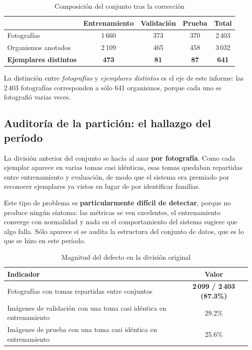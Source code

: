 \documentclass[onecolumn]{article}
\begin{document}
\begin{table}[H]
\centering
\renewcommand{\arraystretch}{1.15}
\caption{Composición del conjunto tras la corrección}
\label{tab:composicion}
\begin{tabular}{lcccc}
\hline
 & \textbf{Entrenamiento} & \textbf{Validación} & \textbf{Prueba} & \textbf{Total} \\
\hline
Fotografías          & 1\,660 & 373 & 370 & 2\,403 \\
Organismos anotados  & 2\,109 & 465 & 458 & 3\,032 \\
\textbf{Ejemplares distintos} & \textbf{473} & \textbf{81} & \textbf{87} & \textbf{641} \\
\hline
\end{tabular}
\end{table}

La distinción entre \emph{fotografías} y \emph{ejemplares distintos} es el eje de este informe: las 2\,403 fotografías corresponden a sólo 641 organismos, porque cada uno se fotografió varias veces.

\subsection{Auditoría de la partición: el hallazgo del período}

La división anterior del conjunto se hacía al azar \textbf{por fotografía}. Como cada ejemplar aparece en varias tomas casi idénticas, esas tomas quedaban repartidas entre entrenamiento y evaluación, de modo que el sistema era premiado por reconocer ejemplares ya vistos en lugar de por identificar familias.

Este tipo de problema es \textbf{particularmente difícil de detectar}, porque no produce ningún síntoma: las métricas se ven excelentes, el entrenamiento converge con normalidad y nada en el comportamiento del sistema sugiere que algo falla. Sólo aparece si se audita la estructura del conjunto de datos, que es lo que se hizo en este período.

\begin{table}[H]
\centering
\renewcommand{\arraystretch}{1.15}
\caption{Magnitud del defecto en la división original}
\label{tab:fuga}
\begin{tabular}{lc}
\hline
\textbf{Indicador} & \textbf{Valor} \\
\hline
Fotografías con tomas repartidas entre conjuntos & \textbf{2\,099 / 2\,403 (87.3\%)} \\
Imágenes de validación con una toma casi idéntica en entrenamiento & 29.2\% \\
Imágenes de prueba con una toma casi idéntica en entrenamiento & 25.6\% \\
\hline
\end{tabular}
\end{table}
\end{document}
